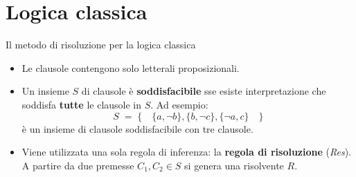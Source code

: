 \documentclass{beamer}
\begin{document}
\section{Logica classica}
\begin{frame}{Il metodo di risoluzione per la logica classica}
    \begin{itemize}
        \item Le clausole contengono solo letterali proposizionali.
        \vspace{10px}
        \item Un insieme $S$ di clausole è \textbf{soddisfacibile} sse esiste interpretazione che soddisfa \textbf{tutte} le clausole in $S$.
        Ad esempio:
        \[S \; = \; \{ \quad \{a, \lnot b\}, \{b, \lnot c\}, \{\lnot a, c\} \quad \}\]
        è un insieme di clausole soddisfacibile con tre clausole.
        \vspace{10px}
        \item Viene utilizzata una sola regola di inferenza: la \textbf{regola di risoluzione} (\emph{Res}). A partire da due premesse $C_1, C_2 \in S$ si genera una risolvente $R$.
    \end{itemize}
\end{frame}
\end{document}

